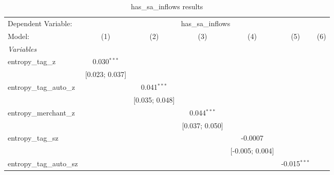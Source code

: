
\begin{table}[htbp]
   \centering
   \tiny
   \begin{threeparttable}[b]
      \caption{\label{tab:reg_has_sa_inflows_full_nofe.tex} has\_sa\_inflows results}
      \begin{tabular}{lcccccc}
         \tabularnewline \midrule \midrule
         Dependent Variable: & \multicolumn{6}{c}{has\_sa\_inflows}\\
         Model:                    & (1)                             & (2)              & (3)               & (4)                             & (5)               & (6)\\  
         \midrule
         \emph{Variables}\\
         entropy\_tag\_z           & 0.030$^{***}$                   &                  &                   &                                 &                   &   \\   
                                   & [0.023; 0.037]                  &                  &                   &                                 &                   &   \\   
         entropy\_tag\_auto\_z     &                                 & 0.041$^{***}$    &                   &                                 &                   &   \\   
                                   &                                 & [0.035; 0.048]   &                   &                                 &                   &   \\   
         entropy\_merchant\_z      &                                 &                  & 0.044$^{***}$     &                                 &                   &   \\   
                                   &                                 &                  & [0.037; 0.050]    &                                 &                   &   \\   
         entropy\_tag\_sz          &                                 &                  &                   & -0.0007                         &                   &   \\   
                                   &                                 &                  &                   & [-0.005; 0.004]                 &                   &   \\   
         entropy\_tag\_auto\_sz    &                                 &                  &                   &                                 & -0.015$^{***}$    &   \\   

\end{tabular}
\end{threeparttable}
\end{table}
